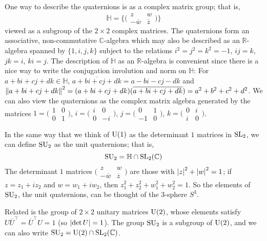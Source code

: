\documentclass[../../rtnotes.tex]{subfiles}
\begin{document}
One way to describe the quaternions is as a complex matrix group; that is, 
\[\mathbb H = \{\bigl(\!\begin{smallmatrix}
	z & w \\ -\overline w & \overline z
\end{smallmatrix}\!\bigr)\}\]
viewed as a subgroup of the $2\times 2$ complex matrices. The quaternions form an associative, non-commutative $\mathbb C$-algebra which may also be described as an $\mathbb R$-algebra spanned by $\{1,i,j,k\}$ subject to the relations $i^2 = j^2 = k^2 = -1$, $ij=k$, $jk = i$, $ki = j$. The description of $\mathbb H$ as an $\mathbb R$-algebra is convenient since there is a nice way to write the conjugation involution and norm on $\mathbb H$: For $a+bi+cj+dk\in\mathbb H$, $\overline{a+bi+cj+dk} = a-bi-cj-dk$ and $\norm{a+bi+cj+dk}^2 = (a+bi+cj+dk)(\overline{a+bi+cj+dk}) = a^2 + b^2 + c^2 + d^2$. We can also view the quaternions as the complex matrix algebra generated by the matrices $1 = \bigl(\!\begin{smallmatrix}
	1 & 0 \\ 0 & 1
\end{smallmatrix}\!\bigr)$, $i = \bigl(\!\begin{smallmatrix}
	i & 0 \\ 0 & -i
\end{smallmatrix}\!\bigr)$, $j = \bigl(\!\begin{smallmatrix}
	0 & 1 \\ -1 & 0
\end{smallmatrix}\!\bigr)$, $k = \bigl(\!\begin{smallmatrix}
	0 & i \\ i & 0
\end{smallmatrix}\!\bigr)$.

In the same way that we think of $\operatorname{U}(1)$ as the determinant $1$ matrices in $\operatorname{SL}_2$, we can define $\operatorname{SU}_2$ as the unit quaternions; that is, 
\[\operatorname{SU}_2= \mathbb H\cap \operatorname{SL}_2(\mathbb C)\]
The determinant $1$ matrices $\bigl(\!\begin{smallmatrix}
	z & w \\ -\overline w & \overline z
\end{smallmatrix}\!\bigr)$ are those with $\abs{z}^2+\abs{w}^2=1$; if $z = z_1+iz_2$ and $w = w_1 + iw_2$, then $z_1^2+z_2^2+w_1^2+w_2^2 = 1$. So the elements of $\operatorname{SU}_2$, the unit quaternions, can be thought of the $3$-sphere $S^3$. 

Related is the group of $2\times 2$ unitary matrices $\operatorname{U}(2)$, whose elements satisfy $U\overline U^\top = \overline U^\top U = 1$ (so $\abs{\det U} = 1$). The group $\operatorname{SU}_2$ is a subgroup of $\operatorname{U}(2)$, and we can also write $\operatorname{SU}_2 = \operatorname{U}(2)\cap \operatorname{SL}_2(\mathbb C)$.
\end{document}
